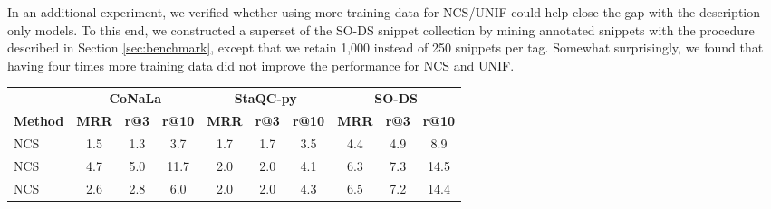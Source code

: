 \documentclass[12pt,conference, onecolumn]{IEEEtran}
\begin{document}
In an additional experiment, we verified whether using more training data for NCS/UNIF could help close the gap with the description-only models. To this end, we constructed a superset of the SO-DS  snippet collection by mining annotated snippets with the procedure described in Section \ref{sec:benchmark}, except that we retain 1,000 instead of 250 snippets per tag. Somewhat surprisingly, we found that having four times more training data did not improve the performance for NCS and UNIF. 


\begin{table}[]
\small
\centering
\begin{tabular}{@{}lccccccccc@{}}
\toprule
                                        & \multicolumn{3}{c}{\textbf{CoNaLa}}                                                                     & \multicolumn{3}{c}{\textbf{StaQC-py}}                                                                   & \multicolumn{3}{c}{\textbf{SO-DS}}                                                                      \\ \cmidrule(l){2-4}  \cmidrule(l){5-7}  \cmidrule(l){8-10} 
\textbf{Method}                         & \multicolumn{1}{l}{\textbf{MRR}} & \multicolumn{1}{l}{\textbf{r@3}} & \multicolumn{1}{l}{\textbf{r@10}} & \multicolumn{1}{l}{\textbf{MRR}} & \multicolumn{1}{l}{\textbf{r@3}} & \multicolumn{1}{l}{\textbf{r@10}} & \multicolumn{1}{l}{\textbf{MRR}} & \multicolumn{1}{l}{\textbf{r@3}} & \multicolumn{1}{l}{\textbf{r@10}} \\ \midrule
NCS                & 1.5                              & 1.3                              & 3.7                               & 1.7                              & 1.7                              & 3.5                               & 4.4                              & 4.9                              & 8.9                               \\
NCS      & 4.7                              & 5.0                              & 11.7                              & 2.0                              & 2.0                              & 4.1                               & 6.3                              & 7.3                              & 14.5                              \\
NCS      & 2.6                              & 2.8                              & 6.0                               & 2.0                              & 2.0                              & 4.3                               & 6.5                              & 7.2                              & 14.4                              \\

\end{tabular}
\end{table}
\end{document}
